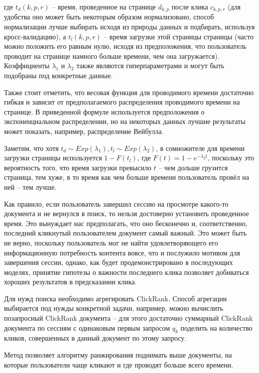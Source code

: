 \documentclass[diploma]{nanolab2015}
\begin{document}
где $t_d(k,p,r)$ -- время, проведенное на странице $d_{k,p}$ после клика $c_{k,p,r}$ (для удобства оно может быть некоторым образом нормализовано, способ нормализации лучше выбирать исходя из природы данных и подбирать, используя кросс-валидацию), а $t_l(k,p,r)$ -- время загрузки этой страницы страницы (часто можно положить его равным нулю, исходя из предположения, что пользователь проводит на странице намного больше времени, чем она загружается). Коэффициенты $\lambda_1$ и $\lambda_2$ также являются гиперпараметрами и могут быть подобраны под конкретные данные.

Также стоит отметить, что весовая функция для проводимого времени достаточно гибкая и зависит от предполагаемого распределения проводимого времени на странице. В приведенной формуле используется предположения о экспоненциальном распределении, но на некоторых данных лучшие результаты может показать, например, распределение Вейбулла.

Заметим, что хотя $t_d \sim Exp(\lambda_1), t_l \sim Exp(\lambda_2)$, в сомножителе для времени загрузки страницы используется $1-F(t_l)$, где $F(t) = 1 - e^{-\lambda_2 t}$, поскольку это вероятность того, что время загрузки превысило $t$ -- чем дольше грузится страница, тем хуже, в то время как чем больше времени пользователь провёл на ней -- тем лучше.

Как правило, если пользователь завершил сессию на просмотре какого-то документа и не вернулся в поиск, то нельзя достоверно установить проведенное время. Это вынуждает нас предполагать, что оно бесконечно и, соответственно, последний кликнутый пользователем документ самый важный. Это может быть не верно, поскольку пользователь мог не найти удовлетворяющего его информационную потребность контента вовсе, что и послужило мотивом для завершения сессии, однако, как будет продемонстрировано в последующих моделях, принятие гипотезы о важности последнего клика позволяет добиваться хороших результатов в предсказании клика. 

Для нужд поиска необходимо агрегировать ClickRank. Способ агрегации выбирается под нужды конкретной задачи, например, можно вычислить позапросный ClickRank документа -- для этого достаточно суммарный ClickRank документа по сессиям с одинаковым первым запросом $q_k$ поделить на количество кликов, совершенных в данный документ по этому запросу.

Метод позволяет алгоритму ранжирования поднимать выше документы, на которые пользователи чаще кликают и где проводят больше всего времени.
\end{document}
